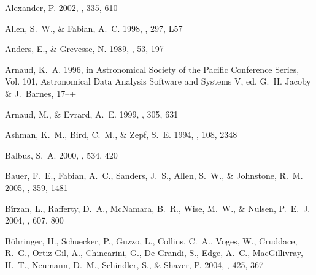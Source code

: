 \documentclass[12pt,preprint]{aastex}
\begin{document}
\begin{thebibliography}{138}

{Alexander}, P. 2002, \mnras, 335, 610

{Allen}, S.~W., \& {Fabian}, A.~C. 1998, \mnras, 297, L57

{Anders}, E., \& {Grevesse}, N. 1989, \gca, 53, 197

{Arnaud}, K.~A. 1996, in Astronomical Society of the Pacific Conference Series,
  Vol. 101, Astronomical Data Analysis Software and Systems V, ed. G.~H.
  {Jacoby} \& J.~{Barnes}, 17--+

{Arnaud}, M., \& {Evrard}, A.~E. 1999, \mnras, 305, 631

{Ashman}, K.~M., {Bird}, C.~M., \& {Zepf}, S.~E. 1994, \aj, 108, 2348

{Balbus}, S.~A. 2000, \apj, 534, 420

{Bauer}, F.~E., {Fabian}, A.~C., {Sanders}, J.~S., {Allen}, S.~W., \&
  {Johnstone}, R.~M. 2005, \mnras, 359, 1481

{B{\^i}rzan}, L., {Rafferty}, D.~A., {McNamara}, B.~R., {Wise}, M.~W., \&
  {Nulsen}, P.~E.~J. 2004, \apj, 607, 800

{B{\"o}hringer}, H., {Schuecker}, P., {Guzzo}, L., {Collins}, C.~A., {Voges},
  W., {Cruddace}, R.~G., {Ortiz-Gil}, A., {Chincarini}, G., {De Grandi}, S.,
  {Edge}, A.~C., {MacGillivray}, H.~T., {Neumann}, D.~M., {Schindler}, S., \&
  {Shaver}, P. 2004, \aap, 425, 367


\end{thebibliography}
\end{document}
